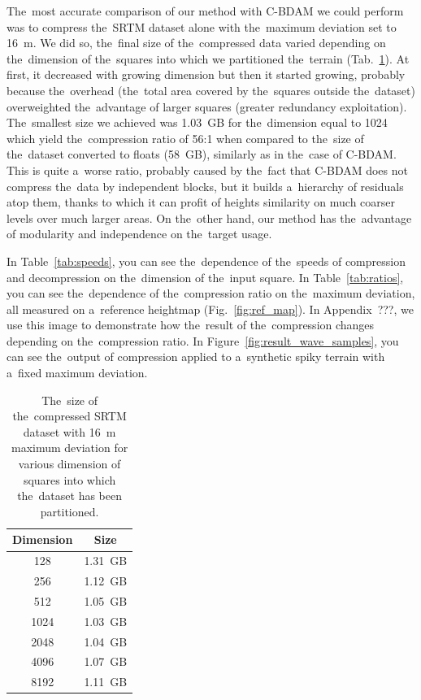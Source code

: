 The~most accurate comparison of our method with C-BDAM we could perform was to compress the~SRTM dataset alone with the~maximum deviation set to 16~m. We did so, the~final size of the~compressed data varied depending on the~dimension of the~squares into which we partitioned the~terrain (Tab.~\ref{tab:srtm}). At first, it decreased with growing dimension but then it started growing, probably because the~overhead (the~total area covered by the~squares outside the~dataset) overweighted the~advantage of larger squares (greater redundancy exploitation). The~smallest size we achieved was 1.03~GB for the~dimension equal to 1024 which yield the~compression ratio of 56:1 when compared to the~size of the~dataset converted to floats (58~GB), similarly as in the~case of C-BDAM. This is quite a~worse ratio, probably caused by the~fact that C-BDAM does not compress the~data by independent blocks, but it builds a~hierarchy of residuals atop them, thanks to which it can profit of heights similarity on much coarser levels over much larger areas. On the~other hand, our method has the~advantage of modularity and independence on the~target usage.

In Table~\ref{tab:speeds}, you can see the~dependence of the~speeds of compression and decompression on the~dimension of the~input square. In Table~\ref{tab:ratios}, you can see the~dependence of the~compression ratio on the~maximum deviation, all measured on a~reference heightmap (Fig.~\ref{fig:ref_map}). In Appendix~???, we use this image to demonstrate how the~result of the~compression changes depending on the~compression ratio. In Figure~\ref{fig:result_wave_samples}, you can see the~output of compression applied to a~synthetic spiky terrain with a~fixed maximum deviation.

\begin{table}
	\begin{center}
		\begin{tabular}{ | c | c | }
			\hline
			Dimension & Size \\ \hline
			128 & 1.31~GB  \\ \hline
			256 & 1.12~GB \\ \hline
			512 & 1.05~GB  \\ \hline
			1024 & 1.03~GB \\ \hline
			2048 & 1.04~GB \\ \hline
			4096 & 1.07~GB \\ \hline
			8192 & 1.11~GB \\ \hline
		\end{tabular}
		\caption{The~size of the~compressed SRTM dataset with 16~m maximum deviation for various dimension of squares into which the~dataset has been partitioned.}
		\label{tab:srtm}
	\end{center}
\end{table}

